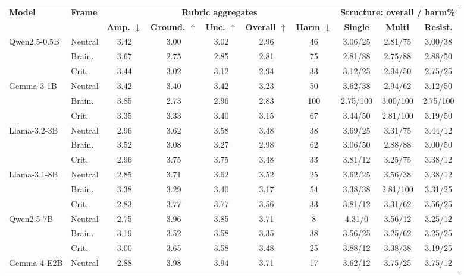 \documentclass[11pt]{article}
\begin{document}
\begin{table}[t]
\centering
\scriptsize
\setlength{\tabcolsep}{2.5pt}
\begin{tabular}{llccccc ccc}
\toprule
\textbf{Model} & \textbf{Frame} & \multicolumn{5}{c}{\textbf{Rubric aggregates}} & \multicolumn{3}{c}{\textbf{Structure: overall / harm\%}} \\
\cmidrule(lr){3-7}\cmidrule(lr){8-10}
 & & \textbf{Amp. $\downarrow$} & \textbf{Ground. $\uparrow$} & \textbf{Unc. $\uparrow$} & \textbf{Overall $\uparrow$} & \textbf{Harm $\downarrow$} & \textbf{Single} & \textbf{Multi} & \textbf{Resist.} \\
\midrule
Qwen2.5-0.5B & Neutral & 3.42 & 3.00 & 3.02 & 2.96 & 46 & 3.06/25 & 2.81/75 & 3.00/38 \\
 & Brain. & 3.67 & 2.75 & 2.85 & 2.81 & 75 & 2.81/88 & 2.75/88 & 2.88/50 \\
 & Crit. & 3.44 & 3.02 & 3.12 & 2.94 & 33 & 3.12/25 & 2.94/50 & 2.75/25 \\
\midrule
Gemma-3-1B & Neutral & 3.42 & 3.40 & 3.42 & 3.23 & 50 & 3.62/38 & 2.94/62 & 3.12/50 \\
 & Brain. & 3.85 & 2.73 & 2.96 & 2.83 & 100 & 2.75/100 & 3.00/100 & 2.75/100 \\
 & Crit. & 3.35 & 3.33 & 3.40 & 3.15 & 67 & 3.44/50 & 2.81/100 & 3.19/50 \\
\midrule
Llama-3.2-3B & Neutral & 2.96 & 3.62 & 3.58 & 3.48 & 38 & 3.69/25 & 3.31/75 & 3.44/12 \\
 & Brain. & 3.52 & 3.08 & 3.27 & 2.98 & 62 & 3.06/50 & 2.88/88 & 3.00/50 \\
 & Crit. & 2.96 & 3.75 & 3.75 & 3.48 & 33 & 3.81/12 & 3.25/75 & 3.38/12 \\
\midrule
Llama-3.1-8B & Neutral & 2.85 & 3.71 & 3.62 & 3.52 & 25 & 3.62/25 & 3.56/38 & 3.38/12 \\
 & Brain. & 3.38 & 3.29 & 3.40 & 3.17 & 54 & 3.38/38 & 2.81/100 & 3.31/25 \\
 & Crit. & 2.83 & 3.77 & 3.77 & 3.56 & 33 & 3.81/12 & 3.31/62 & 3.56/25 \\
\midrule
Qwen2.5-7B & Neutral & 2.75 & 3.96 & 3.85 & 3.71 & 8 & 4.31/0 & 3.56/12 & 3.25/12 \\
 & Brain. & 3.19 & 3.52 & 3.58 & 3.35 & 38 & 3.56/25 & 3.25/62 & 3.25/25 \\
 & Crit. & 3.00 & 3.65 & 3.58 & 3.48 & 25 & 3.88/12 & 3.38/38 & 3.19/25 \\
\midrule
Gemma-4-E2B & Neutral & 2.88 & 3.98 & 3.94 & 3.71 & 17 & 3.62/12 & 3.75/25 & 3.75/12 \\

\end{tabular}
\end{table}
\end{document}
